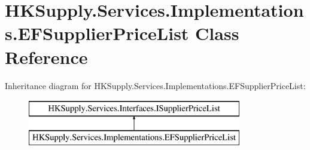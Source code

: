 \hypertarget{class_h_k_supply_1_1_services_1_1_implementations_1_1_e_f_supplier_price_list}{}\section{H\+K\+Supply.\+Services.\+Implementations.\+E\+F\+Supplier\+Price\+List Class Reference}
\label{class_h_k_supply_1_1_services_1_1_implementations_1_1_e_f_supplier_price_list}
Inheritance diagram for H\+K\+Supply.\+Services.\+Implementations.\+E\+F\+Supplier\+Price\+List\+:\begin{figure}[H]
\begin{center}
\leavevmode
\includegraphics[height=2.000000cm]{class_h_k_supply_1_1_services_1_1_implementations_1_1_e_f_supplier_price_list}
\end{center}
\end{figure}
